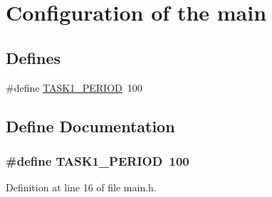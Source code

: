 \hypertarget{group__mainConfig}{
\section{Configuration of the main}
\label{group__mainConfig}
}
\subsection*{Defines}
\begin{DoxyCompactItemize}
\item 
\#define \hyperlink{group__mainConfig_ga745f0e5078faacf33bffbc94239f62a9}{TASK1\_\-PERIOD}~100
\end{DoxyCompactItemize}


\subsection{Define Documentation}
\hypertarget{group__mainConfig_ga745f0e5078faacf33bffbc94239f62a9}{
\subsubsection[{TASK1\_\-PERIOD}]{\setlength{\rightskip}{0pt plus 5cm}\#define TASK1\_\-PERIOD~100}}
\label{group__mainConfig_ga745f0e5078faacf33bffbc94239f62a9}


Definition at line 16 of file main.h.

